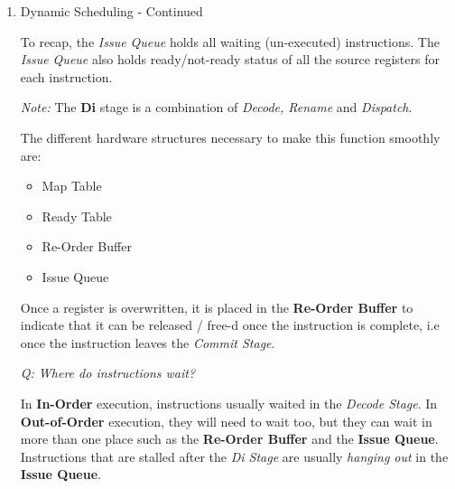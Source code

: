 \documentclass[12pt]{article}
\newenvironment{QandA}{\begin{enumerate}[label=\bfseries\arabic*.]\bfseries}
                      {\end{enumerate}}
\newenvironment{answered}{\par\quad\normalfont}{}
\begin{document}
\begin{QandA}
\item Dynamic Scheduling - Continued
\begin{answered}
To recap, the \textit{Issue Queue} holds all waiting (un-executed) instructions. The \textit{Issue Queue} also holds ready/not-ready status of all the source registers for each instruction. 

\textit{Note:} The \textbf{Di} stage is a combination of \textit{Decode, Rename} and \textit{Dispatch}. 

The different hardware structures necessary to make this function smoothly are:
\begin{itemize}
    \item Map Table
    \item Ready Table
    \item Re-Order Buffer
    \item Issue Queue
\end{itemize}

Once a register is overwritten, it is placed in the \textbf{Re-Order Buffer} to indicate that it can be released / free-d once the instruction is complete, i.e once the instruction leaves the \textit{Commit Stage}. 

\textit{Q: Where do instructions wait?}

\quad In \textbf{In-Order} execution, instructions usually waited in the \textit{Decode Stage}. In \textbf{Out-of-Order} execution, they will need to wait too, but they can wait in more than one place such as the \textbf{Re-Order Buffer} and the \textbf{Issue Queue}. Instructions that are stalled after the \textit{Di Stage} are usually \textit{hanging out} in the \textbf{Issue Queue}.
\end{answered}


\end{QandA}
\end{document}
